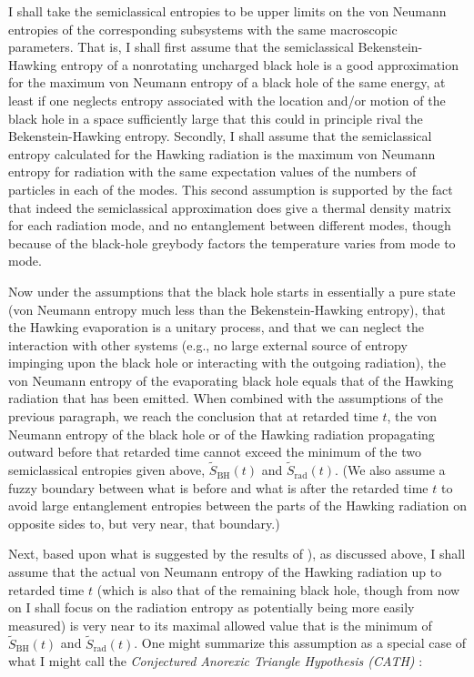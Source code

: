 \documentclass[12pt]{article}
\begin{document}
I shall take the semiclassical entropies to be upper limits on the von Neumann entropies of the corresponding subsystems with the same macroscopic parameters.  That is, I shall first assume that the semiclassical Bekenstein-Hawking entropy of a nonrotating uncharged black hole is a good approximation for the maximum von Neumann entropy of a black hole of the same energy, at least if one neglects entropy associated with the location and/or motion of the black hole in a space sufficiently large that this could in principle rival the Bekenstein-Hawking entropy.  Secondly, I shall assume that the semiclassical entropy calculated for the Hawking radiation is the maximum von Neumann entropy for radiation with the same expectation values of the numbers of particles in each of the modes.  This second assumption is supported by the fact that indeed the semiclassical approximation does give a thermal density matrix for each radiation mode, and no entanglement between different modes, though because of the black-hole greybody factors the temperature varies from mode to mode.

Now under the assumptions that the black hole starts in essentially a pure state (von Neumann entropy much less than the Bekenstein-Hawking entropy), that the Hawking evaporation is a unitary process, and that we can neglect the interaction with other systems (e.g., no large external source of entropy impinging upon the black hole or interacting with the outgoing radiation), the von Neumann entropy of the evaporating black hole equals that of the Hawking radiation that has been emitted.  When combined with the assumptions of the previous paragraph, we reach the conclusion that at retarded time $t$, the von Neumann entropy of the black hole or of the Hawking radiation propagating outward before that retarded time cannot exceed the minimum of the two semiclassical entropies given above, $\tilde{S}_\mathrm{BH}(t)$ and $\tilde{S}_\mathrm{rad}(t)$.  (We also assume a fuzzy boundary between what is before and what is after the retarded time $t$ to avoid large entanglement entropies between the parts of the Hawking radiation on opposite sides to, but very near, that boundary.)

Next, based upon what is suggested by the results of \cite{Page:1993df,Page:1993wv,Sekino:2008he,Susskind:2011ap,Lashkari:2011yi, Edalati:2012jj,Barbon:2012zv}), as discussed above, I shall assume that the actual von Neumann entropy of the Hawking radiation up to retarded time $t$ (which is also that of the remaining black hole, though from now on I shall focus on the radiation entropy as potentially being more easily measured) is very near to its maximal allowed value that is the minimum of $\tilde{S}_\mathrm{BH}(t)$ and $\tilde{S}_\mathrm{rad}(t)$.  One might summarize this assumption as a special case of what I might call the {\it {Conjectured Anorexic Triangle Hypothesis (CATH)}} \cite{Cathy}:  
\end{document}
